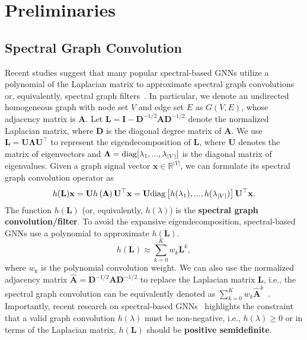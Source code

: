 \documentclass{article}
\begin{document}
\section{Preliminaries}
\subsection{Spectral Graph Convolution}\label{se:spectral_g_conv}
Recent studies suggest that many popular spectral-based GNNs utilize a polynomial of the Laplacian matrix to approximate spectral graph convolutions or, equivalently, spectral graph filters~\cite{gcn,Chebnet,bernnet,jacobi,chebnetii}. In particular,
we denote an undirected homogeneous graph with node set $V$ and edge set $E$ as $G(V,E)$, whose adjacency matrix is  $\mathbf{A}$. Let $\mathbf{L}= \mathbf{I}-\mathbf{D}^{-1/2}\mathbf{A}\mathbf{D}^{-1/2}$ denote the normalized Laplacian matrix, where $\mathbf{D}$ is the diagonal degree matrix of $\mathbf{A}$. We use $\mathbf{L}=\mathbf{U}\mathbf{\Lambda}\mathbf{U}^{\top}$ to represent the eigendecomposition of $\mathbf{L}$, where $\mathbf{U}$ denotes the matrix of eigenvectors and $\mathbf{\Lambda}={\rm diag}[\lambda_1,...,\lambda_{|V|}]$ is the diagonal matrix of eigenvalues. Given a graph signal vector $\mathbf{x} \in \mathbb{R}^{|V|}$, we can formulate its spectral graph convolution operator as
\begin{equation}\label{spec_gnn}
h(\mathbf{L})\mathbf{x}=\mathbf{U}h \left(\mathbf{\Lambda}\right)\mathbf{U}^{\top}\mathbf{x}=\mathbf{U} {\rm diag}\left[h(\lambda_1),...,h(\lambda_{|V|})\right]\mathbf{U}^{\top}\mathbf{x}.
\end{equation}
The function $h(\mathbf{L})$ (or, equivalently, $h(\lambda)$) is the \textbf{ spectral graph convolution/filter}. To avoid the expansive eigendecomposition, spectral-based GNNs use a polynomial to approximate $h(\mathbf{L})$.
\begin{equation}\label{eq:h(L)}
    h(\mathbf{L}) \approx \sum\limits_{k=0}^K w_k \mathbf{L}^k,
\end{equation}
where $w_k$ is the polynomial convolution weight. We can also use the normalized adjacency matrix $\hat{\mathbf{A}}=\mathbf{D}^{-1/2}\mathbf{A}\mathbf{D}^{-1/2}$ to replace the Laplacian matrix $\mathbf{L}$, i.e., the spectral graph convolution can be equivalently denoted as $\sum\nolimits_{k=0}^K w_k \hat{\mathbf{A}}^k$~\cite{gprgnn,bernnet}. Importantly, recent research on spectral-based GNNs~\cite{bernnet} highlights the constraint that a valid graph convolution $h(\lambda)$ must be non-negative, i.e., $h(\lambda) \geq 0$ or in terms of the Laplacian matrix, $h(\mathbf{L})$ should be \textbf{positive semidefinite}. 
\end{document}
